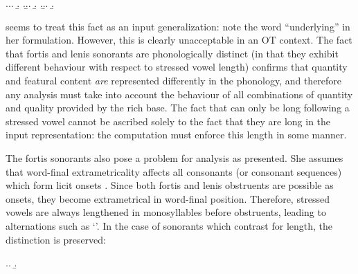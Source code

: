 \ex.\a.\a.
\b.
\z.\b.\a.
\b.
\z.\b.\a.
\b.

\citet{carlyle88:_breton} seems to treat this fact as an input generalization: note the word \enquote{underlying} in her formulation. However, this is clearly unacceptable in an OT context. The fact that fortis and lenis sonorants are phonologically distinct (in that they exhibit different behaviour with respect to stressed vowel length) confirms that quantity and featural content \emph{are} represented differently in the phonology, and therefore any analysis must take into account the behaviour of all combinations of quantity and quality provided by the rich base. The fact that \ipa{[m~ɲ~ʎ]} can only be long following a stressed vowel cannot be ascribed solely to the fact that they are long in the input representation: the computation must enforce this length in some manner.

The fortis sonorants also pose a problem for  analysis as presented. She assumes that word\hyp final extrametricality affects all consonants (or consonant sequences) which form licit onsets \citep[\cfm][]{borowsky86:_topic_englis,ito86:_syllab}. Since both fortis and lenis obstruents are possible as onsets, they become extrametrical in word\hyp final position. Therefore, stressed vowels are always lengthened in monosyllables before obstruents, leading to alternations such as \alternation{[ˈskotːa]}{[ˈskoːt]} `'. In the case of sonorants which contrast for length, the distinction is preserved:

\ex.\a.
\b.

